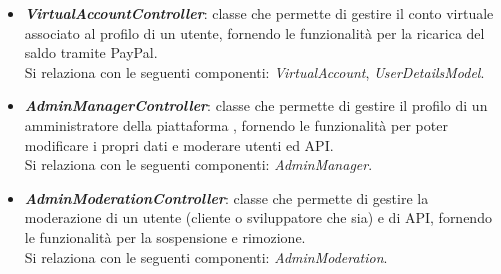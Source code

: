 \begin{itemize}
\begin{itemize}
		\item \textbf{\textit{VirtualAccountController}}: classe che permette di gestire il conto virtuale associato al profilo di un utente, fornendo le funzionalità per la ricarica del saldo tramite PayPal.\\
		Si relaziona con le seguenti componenti: \textit{VirtualAccount}, \textit{UserDetailsModel}.
		
		\item \textbf{\textit{AdminManagerController}}: classe che permette di gestire il profilo di un amministratore della piattaforma \progetto, fornendo le funzionalità per poter modificare i propri dati e moderare utenti ed API.\\
		Si relaziona con le seguenti componenti: \textit{AdminManager}.
		
		\item \textbf{\textit{AdminModerationController}}: classe che permette di gestire la moderazione di un utente (cliente o sviluppatore che sia) e di API, fornendo le funzionalità per la sospensione e rimozione.\\
		Si relaziona con le seguenti componenti: \textit{AdminModeration}.
		
	\end{itemize}
\end{itemize}